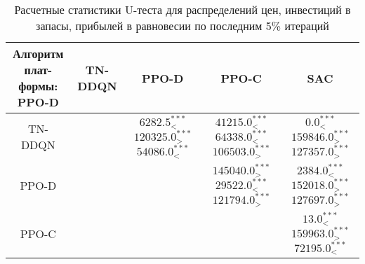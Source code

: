 \bgroup
\def\arraystretch{1.25}
\begin{table}[H]
	\caption{Расчетные статистики U-теста для распределений цен, инвестиций в запасы, прибылей в равновесии по последним 5\% итераций}
	\label{tables:ks_dynamic:p_y_pi}
	\begin{center}
		\vspace{-0.5em}
		\begin{tabular}{c||cccc}
			\toprule
			\makecell{Алгоритм плат-\\ формы: PPO-D} & TN-DDQN & PPO-D & PPO-C & SAC \\
			\midrule
			TN-DDQN & \makecell[c]{ \\[1ex] } & \makecell[c]{ $6282.5^{***}_{<} $\\$120325.0^{***}_{>} $\\$54086.0^{***}_{<} $\\[1ex] } & \makecell[c]{ $41215.0^{***}_{<} $\\$64338.0^{***}_{<} $\\$106503.0^{***}_{>} $\\[1ex] } & \makecell[c]{ $0.0^{***}_{<} $\\$159846.0^{***}_{>} $\\$127357.0^{***}_{>} $\\[1ex] } \\
			PPO-D & \makecell[c]{ \\[1ex] } & \makecell[c]{ \\[1ex] } & \makecell[c]{ $145040.0^{***}_{>} $\\$29522.0^{***}_{<} $\\$121794.0^{***}_{>} $\\[1ex] } & \makecell[c]{ $2384.0^{***}_{<} $\\$152018.0^{***}_{>} $\\$127697.0^{***}_{>} $\\[1ex] } \\
			PPO-C & \makecell[c]{ \\[1ex] } & \makecell[c]{ \\[1ex] } & \makecell[c]{ \\[1ex] } & \makecell[c]{ $13.0^{***}_{<} $\\$159963.0^{***}_{>} $\\$72195.0^{***}_{<} $\\[1ex] } \\
			\bottomrule
		\end{tabular}
	\end{center}
\end{table}
\egroup